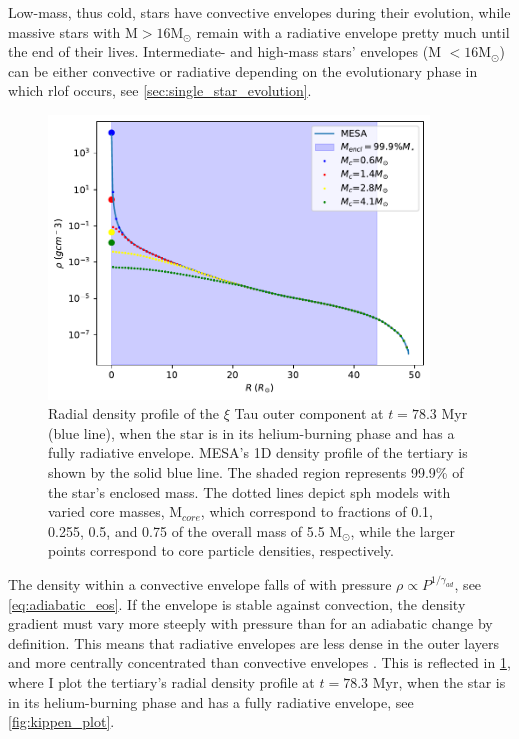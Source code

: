 Low-mass, thus cold, stars have convective envelopes during their evolution, while massive stars with M$>16$M$_{\odot}$ remain with a radiative envelope pretty much until the end of their lives. Intermediate- and high-mass stars' envelopes (M  $<16$M$_{\odot}$) can be either convective or radiative depending on the evolutionary phase in which \ac{rlof} occurs, see \cref{sec:single_star_evolution}. 
\begin{figure}[H]
    \centering
    \includegraphics[width=0.9\textwidth]{Thesis/graphs/density_profile_radiative_envelope.pdf}
    \caption{Radial density profile of the  $\xi$ Tau outer component at $t=78.3$ Myr (blue line), when the star is in its helium-burning phase and has a fully radiative envelope. MESA's 1D density profile of the tertiary is shown by the solid blue line. The shaded region represents 99.9\% of the star's enclosed mass. The dotted lines depict \ac{sph} models with varied core masses, M$_{core}$, which correspond to fractions of 0.1, 0.255, 0.5, and 0.75 of the overall mass of 5.5 M$_{\odot}$, while the larger points correspond to core particle densities, respectively.}
    \label{fig:density_profile_radiative}
\end{figure}
The density within a convective envelope falls of with pressure $\rho \propto P^{1/\gamma_{ad}}$, see \cref{eq:adiabatic_eos}. If the envelope is stable against convection, the density gradient must vary more steeply with pressure than for an adiabatic change by definition. This means that radiative envelopes are less dense in the outer layers and more centrally concentrated than convective envelopes \cite{pols2011stellar}. This is reflected in \cref{fig:density_profile_radiative}, where I plot the tertiary's radial density profile at $t=78.3$ Myr, when the star is in its helium-burning phase and has a fully radiative envelope, see \cref{fig:kippen_plot}.

